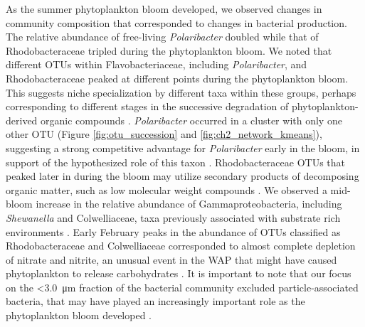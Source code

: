 As the summer phytoplankton bloom developed, we observed changes in community composition that corresponded to changes in bacterial production. The relative abundance of free-living \textit{Polaribacter} doubled while that of Rhodobacteraceae tripled during the phytoplankton bloom. We noted that different OTUs within Flavobacteriaceae, including \textit{Polaribacter}, and Rhodobacteraceae peaked at different points during the phytoplankton bloom. This suggests niche specialization by different taxa within these groups, perhaps corresponding to different stages in the successive degradation of phytoplankton-derived organic compounds \citep{Teeling2012-jz,Klindworth2014-ba}. \textit{Polaribacter} occurred in a cluster with only one other OTU (Figure \ref{fig:otu_succession} and \ref{fig:ch2_network_kmeans}), suggesting a strong competitive advantage for \textit{Polaribacter} early in the bloom, in support of the hypothesized role of this taxon \citep{williams2013role}. Rhodobacteraceae OTUs that peaked later in during the bloom may utilize secondary products of decomposing organic matter, such as low molecular weight compounds \citep{Voget2015-ch}. We observed a mid-bloom increase in the relative abundance of Gammaproteobacteria, including \textit{Shewanella} and Colwelliaceae, taxa previously associated with substrate rich environments \citep{Baelum2012-re,Delmont2014-ng}. Early February peaks in the abundance of OTUs classified as Rhodobacteraceae and Colwelliaceae corresponded to almost complete depletion of nitrate and nitrite, an unusual event in the WAP that might have caused phytoplankton to release carbohydrates \citep{hansell2014biogeochemistry}. It is important to note that our focus on the <\SI{3.0}{\micro\meter} fraction of the bacterial community excluded particle-associated bacteria, that may have played an increasingly important role as the phytoplankton bloom developed \citep{riemann2000dynamics}.

